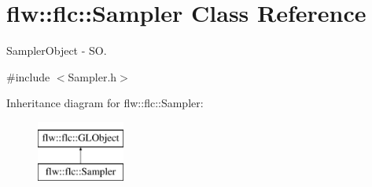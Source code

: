 \hypertarget{classflw_1_1flc_1_1Sampler}{}\section{flw\+:\+:flc\+:\+:Sampler Class Reference}
\label{classflw_1_1flc_1_1Sampler}


Sampler\+Object -\/ SO.  




{\ttfamily \#include $<$Sampler.\+h$>$}

Inheritance diagram for flw\+:\+:flc\+:\+:Sampler\+:\begin{figure}[H]
\begin{center}
\leavevmode
\includegraphics[height=2.000000cm]{classflw_1_1flc_1_1Sampler}
\end{center}
\end{figure}
